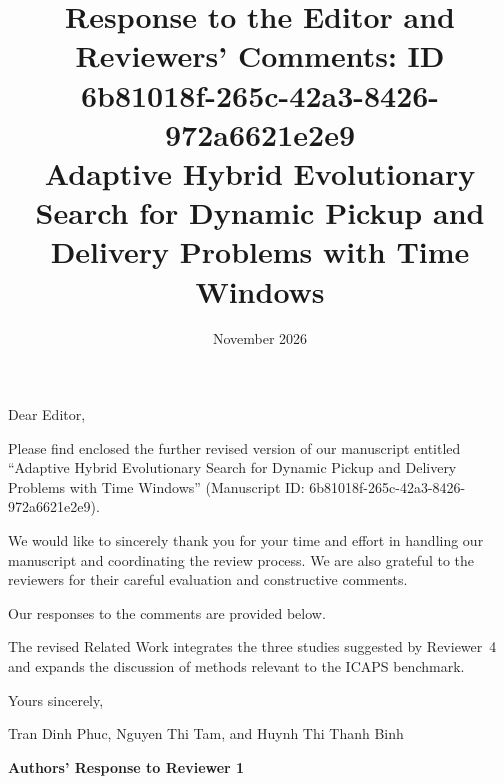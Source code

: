\documentclass[11pt]{article}
\begin{document}
\title{
    {\bfseries Response to the Editor and Reviewers' Comments: ID 6b81018f-265c-42a3-8426-972a6621e2e9}\\\vspace*{2cm}
    {\Large  Adaptive Hybrid Evolutionary Search for Dynamic Pickup and Delivery Problems with Time Windows}\\\vspace*{2cm}
   \vspace*{5cm} }

\author{}

\date{November 2026}
\maketitle\thispagestyle{empty}\newpage
\setlength{\parskip}{2ex plus0.5ex minus0.2ex} %

\thispagestyle{empty} \vspace{-10mm}

\noindent Dear Editor,

\medskip

\noindent
Please find enclosed the further revised version of our manuscript entitled
``Adaptive Hybrid Evolutionary Search for Dynamic Pickup and Delivery Problems with Time Windows''
(Manuscript ID: 6b81018f-265c-42a3-8426-972a6621e2e9).

\medskip

\noindent
We would like to sincerely thank you for your time and effort in handling our manuscript and coordinating the review process. We are also grateful to the reviewers for their careful evaluation and constructive comments.

\medskip

\noindent
Our responses to the comments are provided below.

\noindent The revised Related Work integrates the three studies suggested by Reviewer~4 and expands the discussion of methods relevant to the ICAPS benchmark.

\noindent Yours sincerely,

\noindent Tran Dinh Phuc, Nguyen Thi Tam, and Huynh Thi Thanh Binh\vspace{5mm}

\setlength{\parskip}{0pt} %

\clearpage
\begin{center}
\textbf{\Large Authors' Response to Reviewer 1}
\end{center}
\end{document}
